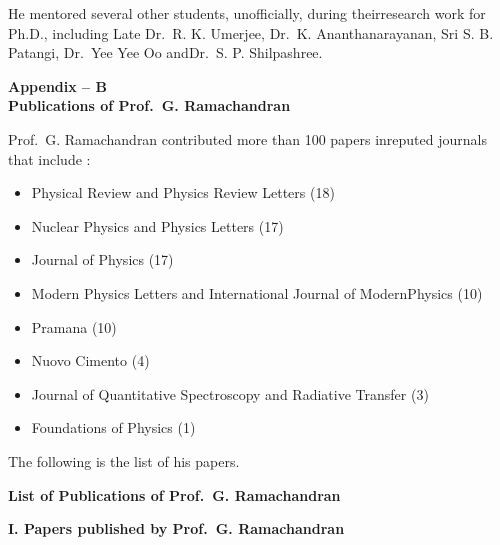 He mentored several other students, unofficially, during their\break research work for Ph.D., including Late Dr.\ R. K. Umerjee, Dr.\ K. Ananthanarayanan, Sri S. B. Patangi, Dr.\ Yee Yee Oo and\break Dr.\ S. P. Shilpashree.

\newpage

\begin{center}
\textbf{Appendix -- B}\\[4pt]
\textbf{Publications of Prof.\ G. Ramachandran}
\end{center}

Prof.\ G. Ramachandran contributed more than 100 papers in\break reputed journals that include :
\begin{itemize}
\item Physical Review and Physics Review Letters (18)
\item Nuclear Physics and Physics Letters (17)
\item Journal of Physics (17)
\item Modern Physics Letters and International Journal of Modern\break Physics (10) 
\item Pramana (10)
\item Nuovo Cimento (4)
\item Journal of Quantitative Spectroscopy and Radiative Transfer (3)
\item Foundations of Physics (1)
\end{itemize}

The following is the list of his papers.

\newpage

\begin{center}
{\large\bfseries List of Publications of Prof.\ G. Ramachandran}
\end{center}

\noindent
\textbf{I. Papers published by Prof.\ G. Ramachandran}

\medskip

